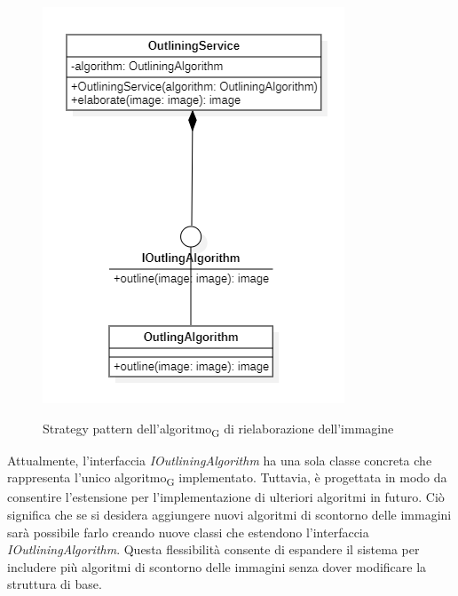 \begin{figure}[H]
    \centering
    \includegraphics[scale = 0.8]{img/outlineStrategy.png}\\
    \caption{Strategy pattern dell'algoritmo\textsubscript{G} di rielaborazione dell'immagine}
\end{figure}

Attualmente, l'interfaccia \textit{IOutliningAlgorithm} ha una sola classe concreta che rappresenta l'unico algoritmo\textsubscript{G} implementato. Tuttavia, è progettata in modo da consentire l'estensione per l'implementazione di ulteriori 
algoritmi in futuro. Ciò significa che se si desidera aggiungere nuovi algoritmi di scontorno delle immagini sarà possibile farlo creando nuove classi che estendono l'interfaccia \textit{IOutliningAlgorithm}. 
Questa flessibilità consente di espandere il sistema per includere più algoritmi di scontorno delle immagini senza dover 
modificare la struttura di base.

